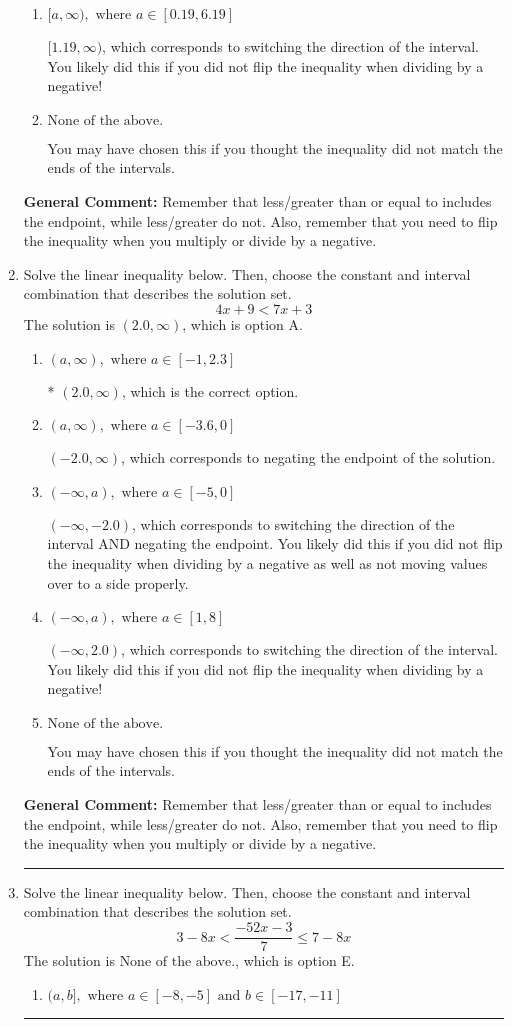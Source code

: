 \documentclass{extbook}[14pt]
\newcommand{\litem}[1]{\item #1

\rule{\textwidth}{0.4pt}}
\begin{document}
\begin{enumerate}
{\begin{enumerate}[label=\Alph*.]
* $(-\infty, 1.19]$, which is the correct option.
\item \( [a, \infty), \text{ where } a \in [0.19, 6.19] \)

 $[1.19, \infty)$, which corresponds to switching the direction of the interval. You likely did this if you did not flip the inequality when dividing by a negative!
\item \( \text{None of the above}. \)

You may have chosen this if you thought the inequality did not match the ends of the intervals.
\end{enumerate}

\textbf{General Comment:} Remember that less/greater than or equal to includes the endpoint, while less/greater do not. Also, remember that you need to flip the inequality when you multiply or divide by a negative.
}
\litem{
Solve the linear inequality below. Then, choose the constant and interval combination that describes the solution set.
\[ 4x + 9 < 7x + 3 \]
The solution is \( (2.0, \infty) \), which is option A.\begin{enumerate}[label=\Alph*.]
\item \( (a, \infty), \text{ where } a \in [-1, 2.3] \)

* $(2.0, \infty)$, which is the correct option.
\item \( (a, \infty), \text{ where } a \in [-3.6, 0] \)

 $(-2.0, \infty)$, which corresponds to negating the endpoint of the solution.
\item \( (-\infty, a), \text{ where } a \in [-5, 0] \)

 $(-\infty, -2.0)$, which corresponds to switching the direction of the interval AND negating the endpoint. You likely did this if you did not flip the inequality when dividing by a negative as well as not moving values over to a side properly.
\item \( (-\infty, a), \text{ where } a \in [1, 8] \)

 $(-\infty, 2.0)$, which corresponds to switching the direction of the interval. You likely did this if you did not flip the inequality when dividing by a negative!
\item \( \text{None of the above}. \)

You may have chosen this if you thought the inequality did not match the ends of the intervals.
\end{enumerate}

\textbf{General Comment:} Remember that less/greater than or equal to includes the endpoint, while less/greater do not. Also, remember that you need to flip the inequality when you multiply or divide by a negative.
}
\litem{
Solve the linear inequality below. Then, choose the constant and interval combination that describes the solution set.
\[ 3 - 8 x < \frac{-52 x - 3}{7} \leq 7 - 8 x \]
The solution is \( \text{None of the above.} \), which is option E.\begin{enumerate}[label=\Alph*.]
\item \( (a, b], \text{ where } a \in [-8, -5] \text{ and } b \in [-17, -11] \)


\end{enumerate}}
\end{enumerate}
\end{document}
